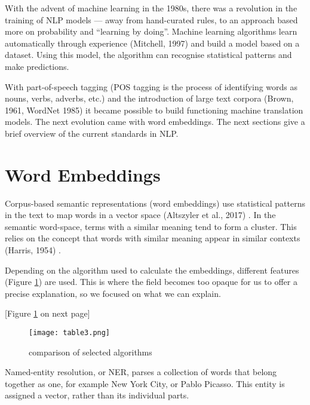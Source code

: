 \documentclass[12pt, usenames, dvipsnames]{report}
\begin{document}
\begin{flushleft}
With the advent of machine learning in the 1980s, there was a revolution in the training of NLP models --- away from hand-curated rules, to an approach based more on probability and “learning by doing”. Machine learning algorithms learn automatically through experience (Mitchell, 1997) \cite{mitchell1997} and build a model based on a dataset.
Using this model, the algorithm can recognise statistical patterns and make predictions.

With part-of-speech tagging (POS tagging is the process of identifying words as nouns, verbs, adverbs, etc.) and the introduction of large text corpora (Brown, 1961, WordNet 1985) \cite{brown1979} \cite{wordnet1995} it became possible to build functioning machine translation models.
The next evolution came with word embeddings.
The next sections give a brief overview of the current standards in NLP.


\section{Word Embeddings}

Corpus-based semantic representations (word embeddings) use statistical patterns in the text to map words in a vector space (Altszyler et al., 2017) \cite{altszyler2017}.
In the semantic word-space, terms with a similar meaning tend to form a cluster.
This relies on the concept that words with similar meaning appear in similar contexts (Harris, 1954) \cite{harris1954}.

Depending on the algorithm used to calculate the embeddings, different features (Figure \ref{fig:table3}) are used.
This is where the field becomes too opaque for us to offer a precise explanation, so we focused on what we can explain.

[Figure \ref{fig:table3} on next page]

\vspace*{1.2em}
\begin{figure}[!htbp]
  \hspace*{-3.666em}
  \texttt{[image: table3.png]}
  \caption{comparison of selected algorithms}
  \label{fig:table3}
\end{figure}
\vspace*{1.2em}

Named-entity resolution, or NER, parses a collection of words that belong together as one, for example New York City, or Pablo Picasso.
This entity is assigned a vector, rather than its individual parts.


\end{flushleft}
\end{document}
